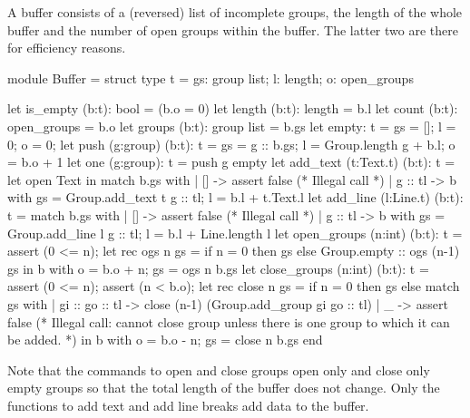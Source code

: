 \documentclass[12pt]{article}
\begin{document}
A buffer consists of a (reversed) list of incomplete groups, the length of the
whole buffer and the number of open groups within the buffer. The latter two
are there for efficiency reasons.
\begin{ocaml}
  module Buffer =
    struct
      type t = {gs: group list;
                l:  length;
                o:  open_groups}

      let is_empty (b:t): bool = (b.o = 0)
      let length (b:t): length = b.l
      let count (b:t): open_groups = b.o
      let groups (b:t): group list = b.gs
      let empty: t =
        {gs = []; l = 0; o = 0;}
      let push (g:group) (b:t): t =
        {gs = g :: b.gs; l = Group.length g + b.l; o = b.o + 1}
      let one (g:group): t =
        push g empty
      let add_text (t:Text.t) (b:t): t =
        let open Text in
        match b.gs with
        | [] ->
           assert false (* Illegal call *)
        | g :: tl ->
           {b with
             gs = Group.add_text t g :: tl;
             l  = b.l + t.Text.l}
      let add_line (l:Line.t) (b:t): t =
        match b.gs with
        | [] ->
           assert false (* Illegal call *)
        | g :: tl ->
           {b with
             gs = Group.add_line l g :: tl;
             l  = b.l + Line.length l}
      let open_groups (n:int) (b:t): t =
        assert (0 <= n);
        let rec ogs n gs =
          if n = 0 then
            gs
          else
            Group.empty :: ogs (n-1) gs
        in
        {b with o = b.o + n; gs = ogs n b.gs}
      let close_groups (n:int) (b:t): t =
        assert (0 <= n);
        assert (n < b.o);
        let rec close n gs =
          if n = 0 then
            gs
          else
            match gs with
            | gi :: go :: tl ->
               close
                 (n-1)
                 (Group.add_group gi go :: tl)
            | _ ->
               assert false (* Illegal call: cannot close group unless there is
                               one group to which it can be added. *)
        in
        {b with o = b.o - n; gs = close n b.gs}
    end
\end{ocaml}
%
Note that the commands to open and close groups open only and close only empty
groups so that the total length of the buffer does not change. Only the
functions to add text and add line breaks add data to the buffer.
\end{document}
